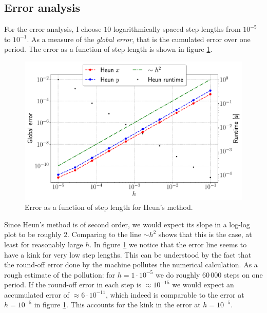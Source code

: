 \subsection{Error analysis}\label{sec:error}

For the error analysis, I choose $10$ logarithmically spaced step-lengths from $10^{-5}$ to $10^{-1}$. As a measure of the \textit{global error}, that is the cumulated error over one period. The error as a function of step length is shown in figure \ref{fig:err_heun}.
\begin{figure}[htb]
		\centering
		\includegraphics[width =0.8\columnwidth]{../fig/err_heun.pdf}
		\caption{Error as a function of step length for Heun's method.}
		\label{fig:err_heun}
\end{figure}
Since Heun's method is of second order, we would expect its slope in a log-log plot to be roughly $2$. Comparing to the line $\sim h^2$ shows that this is the case, at least for reasonably large $h$. In figure \ref{fig:err_heun} we notice that the error line seems to have a kink for very low step lengths. This can be understood by the fact that the round-off error done by the machine pollutes the numerical calculation. As a rough estimate of the pollution: for $h = 1\cdot 10^{-5}$ we do roughly $60\,000$ steps on one period. If the round-off error in each step is $\approx 10^{-15}$ we would expect an accumulated error of $\approx 6\cdot 10^{-11}$, which indeed is comparable to the error at $h = 10^{-5}$ in figure \ref{fig:err_heun}. This accounts for the kink in the error at $h=10^{-5}$.  

